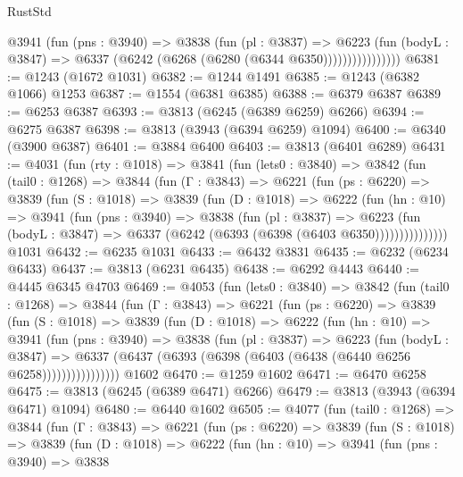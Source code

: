 \begin{lexlean}{RustStd}
\begin{coremodule}
                    @3941
                      (fun (pns : @3940) =>
                      @3838
                        (fun (pl : @3837) =>
                        @6223
                          (fun (bodyL : @3847) =>
                          @6337 (@6242 (@6268 (@6280 (@6344 @6350))))))))))))))))
@6381 := @1243 (@1672 @1031)
@6382 := @1244 @1491
@6385 := @1243 (@6382 @1066) @1253
@6387 := @1554 (@6381 @6385)
@6388 := @6379 @6387
@6389 := @6253 @6387
@6393 := @3813 (@6245 (@6389 @6259) @6266)
@6394 := @6275 @6387
@6398 := @3813 (@3943 (@6394 @6259) @1094)
@6400 := @6340 (@3900 @6387)
@6401 := @3884 @6400
@6403 := @3813 (@6401 @6289)
@6431 := @4031
    (fun (rty : @1018) =>
    @3841
      (fun (lets0 : @3840) =>
      @3842
        (fun (tail0 : @1268) =>
        @3844
          (fun (Γ : @3843) =>
          @6221
            (fun (ps : @6220) =>
            @3839
              (fun (S : @1018) =>
              @3839
                (fun (D : @1018) =>
                @6222
                  (fun (hn : @10) =>
                  @3941
                    (fun (pns : @3940) =>
                    @3838
                      (fun (pl : @3837) =>
                      @6223
                        (fun (bodyL : @3847) =>
                        @6337 (@6242 (@6393 (@6398 (@6403 @6350)))))))))))))))
    @1031
@6432 := @6235 @1031
@6433 := @6432 @3831
@6435 := @6232 (@6234 @6433)
@6437 := @3813 (@6231 @6435)
@6438 := @6292 @4443
@6440 := @4445 @6345 @4703
@6469 := @4053
    (fun (lets0 : @3840) =>
    @3842
      (fun (tail0 : @1268) =>
      @3844
        (fun (Γ : @3843) =>
        @6221
          (fun (ps : @6220) =>
          @3839
            (fun (S : @1018) =>
            @3839
              (fun (D : @1018) =>
              @6222
                (fun (hn : @10) =>
                @3941
                  (fun (pns : @3940) =>
                  @3838
                    (fun (pl : @3837) =>
                    @6223
                      (fun (bodyL : @3847) =>
                      @6337 (@6437 (@6393 (@6398 (@6403 (@6438 (@6440 @6256 @6258))))))))))))))))
    @1602
@6470 := @1259 @1602
@6471 := @6470 @6258
@6475 := @3813 (@6245 (@6389 @6471) @6266)
@6479 := @3813 (@3943 (@6394 @6471) @1094)
@6480 := @6440 @1602
@6505 := @4077
    (fun (tail0 : @1268) =>
    @3844
      (fun (Γ : @3843) =>
      @6221
        (fun (ps : @6220) =>
        @3839
          (fun (S : @1018) =>
          @3839
            (fun (D : @1018) =>
            @6222
              (fun (hn : @10) =>
              @3941
                (fun (pns : @3940) =>
                @3838

\end{coremodule}
\end{lexlean}
